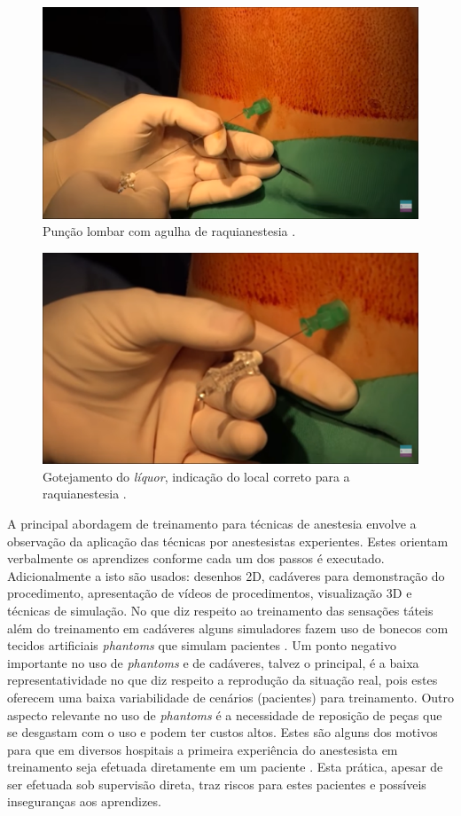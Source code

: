 \begin{figure}[!ht]
   \centering
   \includegraphics[width=0.6\linewidth]{capitulos/figuras/2.PuncaoLombar.png}
   \caption{Punção lombar com agulha de raquianestesia  \cite{Londero2018}.}
   \label{fig:puncaoLombar}
\end{figure}

\begin{figure}[!ht]
   \centering
   \includegraphics[width=0.6\linewidth]{capitulos/figuras/3.GotejamentoLiquor.png}
   \caption{Gotejamento do \textit{líquor}, indicação do local correto para a raquianestesia \cite{Londero2018}.}
   \label{fig:gotejamentoLiquor}
\end{figure}

A principal abordagem de treinamento para técnicas de anestesia envolve a observação da aplicação das técnicas por anestesistas experientes. Estes orientam verbalmente os aprendizes conforme cada um dos passos é executado. Adicionalmente a isto são usados: desenhos 2D, cadáveres para demonstração do procedimento, apresentação de vídeos de procedimentos, visualização 3D e técnicas de simulação. No que diz respeito ao treinamento das sensações táteis além do treinamento em cadáveres alguns simuladores fazem uso de bonecos com tecidos artificiais \textit{phantoms} que simulam pacientes \cite{Dreifaldt2006}. Um ponto negativo importante no uso de \textit{phantoms} e de cadáveres, talvez o principal, é a baixa representatividade no que diz respeito a reprodução da situação real, pois estes oferecem uma baixa variabilidade de cenários (pacientes) para treinamento.  Outro aspecto relevante no uso de \textit{phantoms} é a necessidade de reposição de peças que se desgastam com o uso e podem ter custos altos. Estes são alguns dos motivos para que em diversos hospitais a primeira experiência do anestesista em treinamento seja efetuada diretamente em um paciente \cite{Aggarwal2009, Grantcharov2008, Smith2005, Watterson2007}. Esta prática, apesar de ser efetuada sob supervisão direta, traz riscos para estes pacientes e possíveis inseguranças aos aprendizes. 

